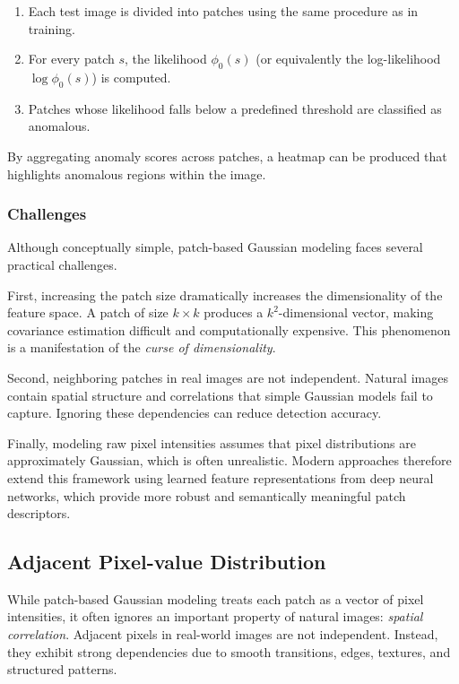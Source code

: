 \documentclass{article}
\begin{document}
\begin{enumerate}
    \item Each test image is divided into patches using the same procedure as in
    training.
    
    \item For every patch $s$, the likelihood $\phi_0(s)$ (or equivalently the
    log-likelihood $\log\phi_0(s)$) is computed.
    
    \item Patches whose likelihood falls below a predefined threshold are
    classified as anomalous.
\end{enumerate}

By aggregating anomaly scores across patches, a heatmap can be produced that
highlights anomalous regions within the image.

\subsubsection{Challenges}

Although conceptually simple, patch-based Gaussian modeling faces several
practical challenges.

First, increasing the patch size dramatically increases the dimensionality of
the feature space. A patch of size $k\times k$ produces a $k^2$-dimensional
vector, making covariance estimation difficult and computationally expensive.
This phenomenon is a manifestation of the \emph{curse of dimensionality}.

Second, neighboring patches in real images are not independent. Natural images
contain spatial structure and correlations that simple Gaussian models fail to
capture. Ignoring these dependencies can reduce detection accuracy.

Finally, modeling raw pixel intensities assumes that pixel distributions are
approximately Gaussian, which is often unrealistic. Modern approaches therefore
extend this framework using learned feature representations from deep neural
networks, which provide more robust and semantically meaningful patch
descriptors.

\subsection{Adjacent Pixel-value Distribution}

While patch-based Gaussian modeling treats each patch as a vector of pixel
intensities, it often ignores an important property of natural images:
\emph{spatial correlation}. Adjacent pixels in real-world images are not
independent. Instead, they exhibit strong dependencies due to smooth transitions,
edges, textures, and structured patterns.
\end{document}
